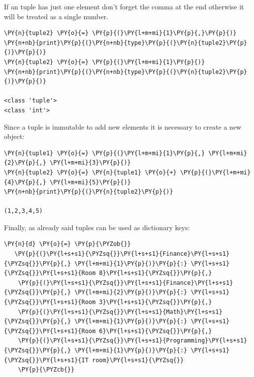 If an tuple has just one element don't forget the comma at the end otherwise it will be 
treated as a single number.

\begin{codebox}
\begin{Verbatim}[commandchars=\\\{\}]
\PY{n}{tuple2} \PY{o}{=} \PY{p}{(}\PY{l+m+mi}{1}\PY{p}{,}\PY{p}{)}
\PY{n+nb}{print}\PY{p}{(}\PY{n+nb}{type}\PY{p}{(}\PY{n}{tuple2}\PY{p}{)}\PY{p}{)}
\PY{n}{tuple2} \PY{o}{=} \PY{p}{(}\PY{l+m+mi}{1}\PY{p}{)}
\PY{n+nb}{print}\PY{p}{(}\PY{n+nb}{type}\PY{p}{(}\PY{n}{tuple2}\PY{p}{)}\PY{p}{)}

<class 'tuple'>
<class 'int'>
\end{Verbatim}
\end{codebox}

Since a tuple is immutable to add new elements it is necessary to create a new object:

\begin{codebox}
\begin{Verbatim}[commandchars=\\\{\}]
\PY{n}{tuple1} \PY{o}{=} \PY{p}{(}\PY{l+m+mi}{1}\PY{p}{,} \PY{l+m+mi}{2}\PY{p}{,} \PY{l+m+mi}{3}\PY{p}{)}
\PY{n}{tuple2} \PY{o}{=} \PY{n}{tuple1} \PY{o}{+} \PY{p}{(}\PY{l+m+mi}{4}\PY{p}{,} \PY{l+m+mi}{5}\PY{p}{)}
\PY{n+nb}{print}\PY{p}{(}\PY{n}{tuple2}\PY{p}{)}

(1,2,3,4,5)
\end{Verbatim}
\end{codebox}

Finally, as already said tuples can be used as dictionary keys:

\begin{codebox}
\begin{Verbatim}[commandchars=\\\{\}]
\PY{n}{d} \PY{o}{=} \PY{p}{\PYZob{}}
   \PY{p}{(}\PY{l+s+s1}{\PYZsq{}}\PY{l+s+s1}{Finance}\PY{l+s+s1}{\PYZsq{}}\PY{p}{,} \PY{l+m+mi}{1}\PY{p}{)}\PY{p}{:} \PY{l+s+s1}{\PYZsq{}}\PY{l+s+s1}{Room 8}\PY{l+s+s1}{\PYZsq{}}\PY{p}{,}
    \PY{p}{(}\PY{l+s+s1}{\PYZsq{}}\PY{l+s+s1}{Finance}\PY{l+s+s1}{\PYZsq{}}\PY{p}{,} \PY{l+m+mi}{2}\PY{p}{)}\PY{p}{:} \PY{l+s+s1}{\PYZsq{}}\PY{l+s+s1}{Room 3}\PY{l+s+s1}{\PYZsq{}}\PY{p}{,}
    \PY{p}{(}\PY{l+s+s1}{\PYZsq{}}\PY{l+s+s1}{Math}\PY{l+s+s1}{\PYZsq{}}\PY{p}{,} \PY{l+m+mi}{1}\PY{p}{)}\PY{p}{:} \PY{l+s+s1}{\PYZsq{}}\PY{l+s+s1}{Room 6}\PY{l+s+s1}{\PYZsq{}}\PY{p}{,}
    \PY{p}{(}\PY{l+s+s1}{\PYZsq{}}\PY{l+s+s1}{Programming}\PY{l+s+s1}{\PYZsq{}}\PY{p}{,} \PY{l+m+mi}{1}\PY{p}{)}\PY{p}{:} \PY{l+s+s1}{\PYZsq{}}\PY{l+s+s1}{IT room}\PY{l+s+s1}{\PYZsq{}}
    \PY{p}{\PYZcb{}}
\end{Verbatim}
\end{codebox}

